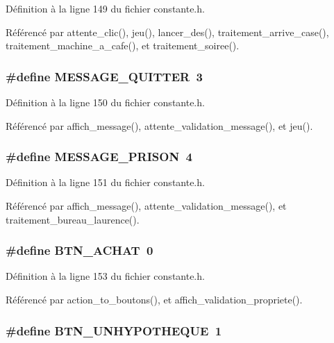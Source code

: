 D\'{e}finition \`{a} la ligne 149 du fichier constante.h.

R\'{e}f\'{e}renc\'{e} par attente\_\-clic(), jeu(), lancer\_\-des(), traitement\_\-arrive\_\-case(), traitement\_\-machine\_\-a\_\-cafe(), et traitement\_\-soiree().
\subsubsection{\setlength{\rightskip}{0pt plus 5cm}\#define MESSAGE\_\-QUITTER~3}\label{constante_8h_49f9cd47df9117797cc86e55461562b0}




D\'{e}finition \`{a} la ligne 150 du fichier constante.h.

R\'{e}f\'{e}renc\'{e} par affich\_\-message(), attente\_\-validation\_\-message(), et jeu().
\subsubsection{\setlength{\rightskip}{0pt plus 5cm}\#define MESSAGE\_\-PRISON~4}\label{constante_8h_b53e9686567d4fc59e121af110cbd36b}




D\'{e}finition \`{a} la ligne 151 du fichier constante.h.

R\'{e}f\'{e}renc\'{e} par affich\_\-message(), attente\_\-validation\_\-message(), et traitement\_\-bureau\_\-laurence().
\subsubsection{\setlength{\rightskip}{0pt plus 5cm}\#define BTN\_\-ACHAT~0}\label{constante_8h_508d7e105c593f32346c1360933e9e6c}




D\'{e}finition \`{a} la ligne 153 du fichier constante.h.

R\'{e}f\'{e}renc\'{e} par action\_\-to\_\-boutons(), et affich\_\-validation\_\-propriete().
\subsubsection{\setlength{\rightskip}{0pt plus 5cm}\#define BTN\_\-UNHYPOTHEQUE~1}\label{constante_8h_8672aa55067d0742ba6fc1af4411c1b6}




